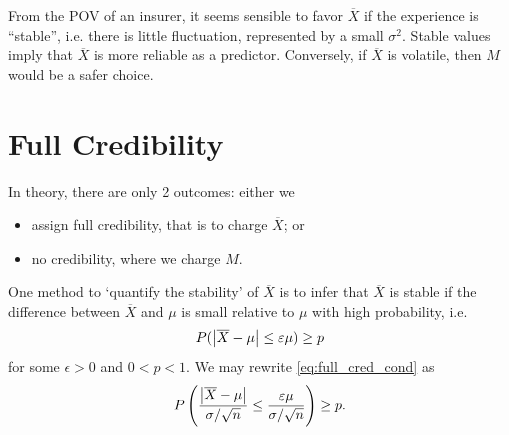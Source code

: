 \documentclass[notoc,notitlepage]{tufte-book}
\begin{document}
From the POV of an insurer, it seems sensible to favor $\overline{X}$ if the
experience is ``stable'', i.e. there is little fluctuation, represented by a
small $\sigma^2$. Stable values imply that $\overline{X}$ is more reliable as a
predictor. Conversely, if $\overline{X}$ is volatile, then $M$ would be a safer
choice.


\section{Full Credibility}%
\label{sec:full_credibility}

In  theory, there are only 2 outcomes: either we
\begin{itemize}
  \item assign full credibility, that is to charge $\overline{X}$; or
  \item no credibility, where we charge $M$.
\end{itemize}
One method to `quantify the stability' of $\overline{X}$  is to infer
that $\overline{X}$ is stable if the difference between $\overline{X}$ and $\mu$
is small relative to $\mu$ with high probability, i.e.
\begin{equation}\label{eq:full_cred_cond}
  P(\left|\overline{X} - \mu\right| \leq \varepsilon \mu) \geq p
\end{equation}
for some $\epsilon > 0$ and $0 < p < 1$. We may rewrite
\cref{eq:full_cred_cond} as
\begin{equation*}
  P \left( \frac{\left|\overline{X} - \mu\right|}{\sigma / \sqrt{n}} \leq
  \frac{\varepsilon\mu}{\sigma / \sqrt{n}} \right) \geq p.
\end{equation*}
\end{document}
